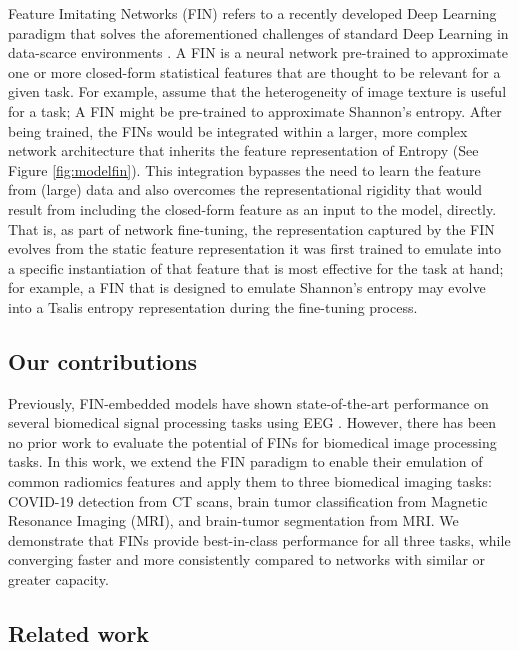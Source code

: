 \documentclass[conference]{IEEEtran}
\begin{document}
\noindent Feature Imitating Networks (FIN) refers to a recently developed Deep Learning paradigm that solves the aforementioned challenges of standard Deep Learning in data-scarce environments \cite{saba2022feature}. A FIN is a neural network pre-trained to approximate one or more closed-form statistical features that are thought to be relevant for a given task. For example, assume that the heterogeneity of image texture is useful for a task; A FIN might be pre-trained to approximate Shannon's entropy. After being trained, the FINs would be integrated within a larger, more complex network architecture that inherits the feature representation of Entropy (See Figure \ref{fig:modelfin}). This integration bypasses the need to learn the feature from (large) data and also overcomes the representational rigidity that would result from including the closed-form feature as an input to the model, directly. That is, as part of network fine-tuning, the representation captured by the FIN evolves from the static feature representation it was first trained to emulate into a specific instantiation of that feature that is most effective for the task at hand; for example, a FIN that is designed to emulate Shannon’s entropy may evolve into a Tsalis entropy representation during the fine-tuning process.


\subsection{Our contributions}
Previously, FIN-embedded models have shown state-of-the-art performance on several biomedical signal processing tasks using EEG \cite{saba2022feature}. However, there has been no prior work to evaluate the potential of FINs for biomedical image processing tasks. In this work, we extend the FIN paradigm to enable their emulation of common radiomics features and apply them to three biomedical imaging tasks: COVID-19 detection from CT scans, brain tumor classification from Magnetic Resonance Imaging (MRI), and brain-tumor segmentation from MRI. We demonstrate that FINs provide best-in-class performance for all three tasks, while converging faster and more consistently compared to networks with similar or greater capacity.

 \subsection{Related work}
\end{document}
